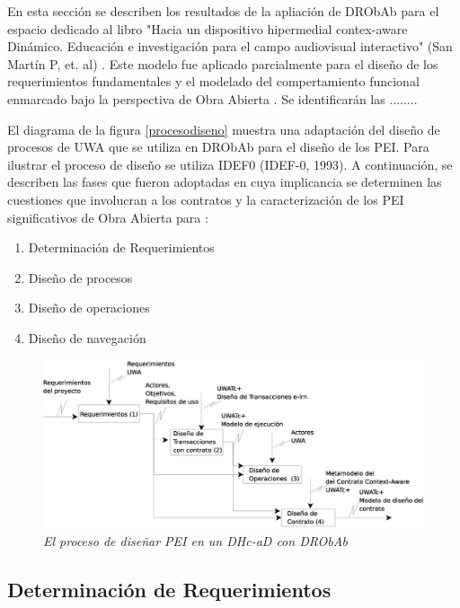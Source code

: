 \documentclass{llncs}
\begin{document}
En esta sección se describen los resultados de la apliación de DRObAb para el espacio dedicado al libro "Hacia un dispositivo hipermedial contex-aware Dinámico. Educación e investigación para el campo audiovisual interactivo" (San Martín P, et. al) \cite{libro}.  Este  modelo fue aplicado parcialmente para el diseño de los requerimientos fundamentales y el modelado del compertamiento funcional enmarcado bajo la perspectiva de Obra Abierta \cite{ObraAbierta}. Se identificarán las ........

El diagrama de la figura \ref{procesodiseno} muestra una adaptación del diseño de procesos de UWA \cite{UWA} que se utiliza en DRObAb para el diseño de los PEI. Para ilustrar el proceso de diseño se utiliza IDEF0 (IDEF-0, 1993). A continuación, se describen las fases que fueron adoptadas en cuya implicancia se determinen las cuestiones que involucran a los contratos y la caracterización de los PEI significativos de Obra Abierta para \cite{libro7}:

\begin{enumerate}
 \item Determinación de Requerimientos 
 \item Diseño de procesos
 \item Diseño de operaciones
 \item Diseño de navegación
\end{enumerate}

	\begin{figure}[!h]
        \begin{center}
	\includegraphics[width=5 in,totalheight=1.5 in]{procesodiseno.eps}
	\caption{\small \sl El proceso de diseñar PEI en un DHc-aD con DRObAb} \label{proceso de diseno}
         \end{center}
         \end{figure}

\subsection{Determinación de Requerimientos} \label{sdr}
\end{document}
